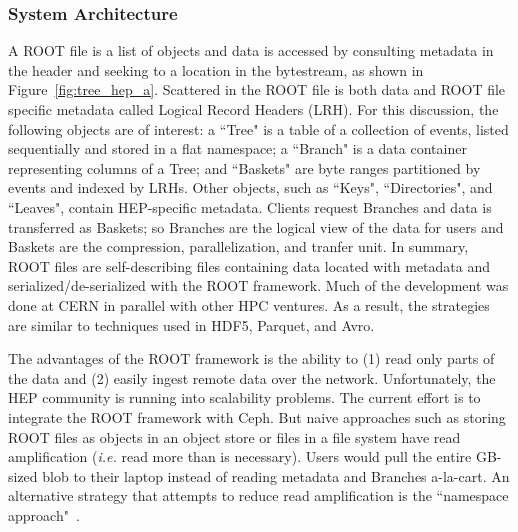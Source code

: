 \subsubsection{System Architecture}

A ROOT file is a list of objects and data is accessed by consulting metadata in
the header and seeking to a location in the bytestream, as shown in
Figure~\ref{fig:tree_hep_a}. Scattered in the ROOT file is both data and ROOT
file specific metadata called Logical Record Headers (LRH).  For this
discussion, the following objects are of interest: a ``Tree" is a table of a
collection of events, listed sequentially and stored in a flat namespace; a
``Branch" is a data container representing columns of a Tree; and ``Baskets"
are byte ranges partitioned by events and indexed by LRHs.  Other objects, such
as ``Keys", ``Directories", and ``Leaves", contain HEP-specific metadata.
Clients request Branches and data is transferred as Baskets; so Branches are
the logical view of the data for users and Baskets are the compression,
parallelization, and tranfer unit. In summary, ROOT files are self-describing
files containing data located with metadata and serialized/de-serialized with
the ROOT framework.  Much of the development was done at CERN in parallel with
other HPC ventures. As a result, the strategies are similar to techniques used
in HDF5, Parquet, and Avro.

The advantages of the ROOT framework is the ability to (1) read only parts of
the data and (2) easily ingest remote data over the network.  Unfortunately,
the HEP community is running into scalability problems.  The current effort is
to integrate the ROOT framework with Ceph. But naive approaches such as storing
ROOT files as objects in an object store or files in a file system have read
amplification ({\it i.e.} read more than is necessary). Users would pull the
entire GB-sized blob to their laptop instead of reading metadata and Branches
a-la-cart. An alternative strategy that attempts to reduce read amplification
is the ``namespace approach"~\cite{pivarski:indico17-root}.

